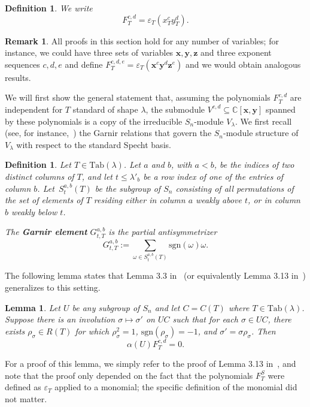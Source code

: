 \documentclass[11pt]{article}
\newtheorem{definition}[theo]{Definition}
\newtheorem{lemma}[theo]{Lemma}
\theoremstyle{definition}
\newtheorem{remark}[theo]{Remark}
\numberwithin{equation}{section}
\newcommand{\sgn}{\mathrm{sgn}}
\newcommand{\Tab}{\mathrm{Tab}}
\begin{document}
\begin{definition}
	We write $$F_T^{c,d}=\varepsilon_T (x_T^cy_T^d).$$
\end{definition}


\begin{remark}
	All proofs in this section  hold for any number of variables; for instance, we could have three sets of variables $\mathbf{x},\mathbf{y},\mathbf{z}$ and three exponent sequences $c,d,e$ and define $F_T^{c,d,e}=\varepsilon_T (\mathbf{x}^c\mathbf{y}^d\mathbf{z}^e)$ and we would obtain analogous results.
\end{remark}

We will first show the general statement that, assuming the polynomials $F_T^{c,d}$ are independent for $T$ standard of shape $\lambda$, the submodule $V^{c,d}\subseteq \mathbb{C}[\mathbf{x},\mathbf{y}]$ spanned by these polynomials is a copy of the irreducible $S_n$-module $V_\lambda$.  We first recall (see, for instance,~\cite{Peel}) the Garnir relations that govern the $S_n$-module structure of $V_\lambda$ with respect to the standard Specht basis.


\begin{definition}
	Let $T\in \Tab(\lambda)$.  Let $a$ and $b$, with $a<b$, be the indices of two distinct columns of $T$, and let $t\le \lambda'_b$ be a row index of one of the entries of column $b$.  Let~$S^{a,b}_t(T)$ be the subgroup of $S_n$ consisting of all permutations of the set of elements of $T$ residing either in column $a$ weakly above $t$, or in column $b$ weakly below $t$. 
	
	The \textbf{Garnir element} $G^{a,b}_{t,T}$ is the partial antisymmetrizer $$G^{a,b}_{t,T}:=\sum_{\omega\in S^{a,b}_t(T)} \mathrm{sgn}(\omega)\omega.$$
\end{definition}

The following lemma states that Lemma 3.3 in~\cite{Peel} (or equivalently Lemma 3.13 in~\cite{GillespieRhoades}) generalizes to this setting.

\begin{lemma}\label{lem:alpha}
	Let $U$ be any subgroup of $S_n$ and let $C=C(T)$ where $T\in \Tab(\lambda)$.  Suppose there is an involution $\sigma\mapsto \sigma'$ on $UC$ such that for each $\sigma\in UC$, there exists $\rho_\sigma\in R(T)$ for which $\rho_\sigma^2=1$, $\sgn(\rho_\sigma)=-1$, and $\sigma'=\sigma\rho_\sigma$.  Then $$\alpha(U) F_T^{c,d}=0.$$
\end{lemma}

For a proof of this lemma, we simply refer to the proof of Lemma 3.13 in~\cite{GillespieRhoades}, and note that the proof only depended on the fact that the polynomials $F_T^S$ were defined as $\varepsilon_T$ applied to a monomial; the specific definition of the monomial did not matter.
\end{document}

